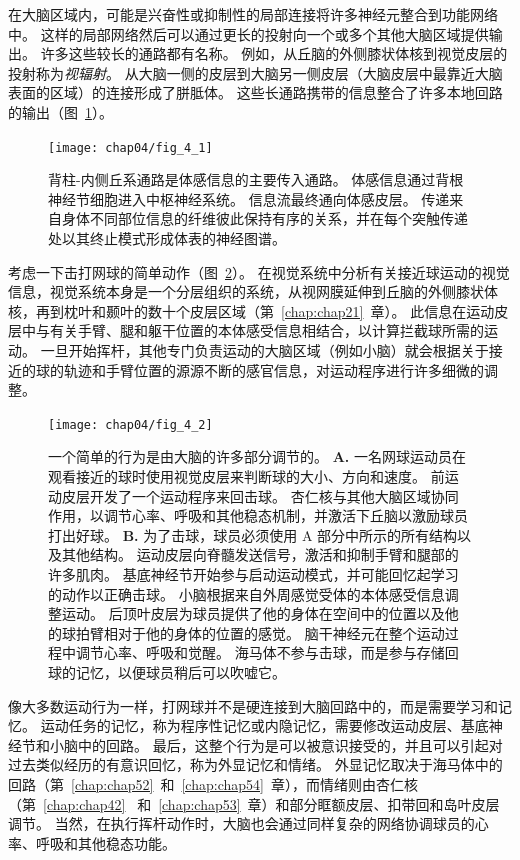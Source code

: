 在大脑区域内，可能是兴奋性或抑制性的局部连接将许多神经元整合到功能网络中。
这样的局部网络然后可以通过更长的投射向一个或多个其他大脑区域提供输出。
许多这些较长的通路都有名称。
例如，从丘脑的外侧膝状体核到视觉皮层的投射称为\textit{视辐射}。
从大脑一侧的皮层到大脑另一侧皮层（大脑皮层中最靠近大脑表面的区域）的连接形成了胼胝体。
这些长通路携带的信息整合了许多本地回路的输出（图~\ref{fig:4_1}）。


\begin{figure}[htbp]
	\centering
	\texttt{[image: chap04/fig\_4\_1]}
	\caption{背柱-内侧丘系通路是体感信息的主要传入通路。 
		体感信息通过背根神经节细胞进入中枢神经系统。 
		信息流最终通向体感皮层。 
		传递来自身体不同部位信息的纤维彼此保持有序的关系，并在每个突触传递处以其终止模式形成体表的神经图谱。}
	\label{fig:4_1}
\end{figure}


考虑一下击打网球的简单动作（图~\ref{fig:4_2}）。 
在视觉系统中分析有关接近球运动的视觉信息，视觉系统本身是一个分层组织的系统，从视网膜延伸到丘脑的外侧膝状体核，再到枕叶和颞叶的数十个皮层区域（第~\ref{chap:chap21}~章）。
此信息在运动皮层中与有关手臂、腿和躯干位置的本体感受信息相结合，以计算拦截球所需的运动。 
一旦开始挥杆，其他专门负责运动的大脑区域（例如小脑）就会根据关于接近的球的轨迹和手臂位置的源源不断的感官信息，对运动程序进行许多细微的调整。

\begin{figure}[htbp]
	\centering
	\texttt{[image: chap04/fig\_4\_2]}
	\caption{一个简单的行为是由大脑的许多部分调节的。 
		\textbf{A.} 一名网球运动员在观看接近的球时使用视觉皮层来判断球的大小、方向和速度。 
		前运动皮层开发了一个运动程序来回击球。 
		杏仁核与其他大脑区域协同作用，以调节心率、呼吸和其他稳态机制，并激活下丘脑以激励球员打出好球。 
		\textbf{B.} 为了击球，球员必须使用 A 部分中所示的所有结构以及其他结构。
		运动皮层向脊髓发送信号，激活和抑制手臂和腿部的许多肌肉。
		基底神经节开始参与启动运动模式，并可能回忆起学习的动作以正确击球。
		小脑根据来自外周感觉受体的本体感受信息调整运动。
		后顶叶皮层为球员提供了他的身体在空间中的位置以及他的球拍臂相对于他的身体的位置的感觉。
		脑干神经元在整个运动过程中调节心率、呼吸和觉醒。
		海马体不参与击球，而是参与存储回球的记忆，以便球员稍后可以吹嘘它。}
	\label{fig:4_2}
\end{figure}


像大多数运动行为一样，打网球并不是硬连接到大脑回路中的，而是需要学习和记忆。
运动任务的记忆，称为程序性记忆或内隐记忆，需要修改运动皮层、基底神经节和小脑中的回路。
最后，这整个行为是可以被意识接受的，并且可以引起对过去类似经历的有意识回忆，称为外显记忆和情绪。 
外显记忆取决于海马体中的回路（第~\ref{chap:chap52}~和~\ref{chap:chap54}~章），而情绪则由杏仁核（第~\ref{chap:chap42}~ 和~\ref{chap:chap53}~章）和部分眶额皮层、扣带回和岛叶皮层调节。
当然，在执行挥杆动作时，大脑也会通过同样复杂的网络协调球员的心率、呼吸和其他稳态功能。



